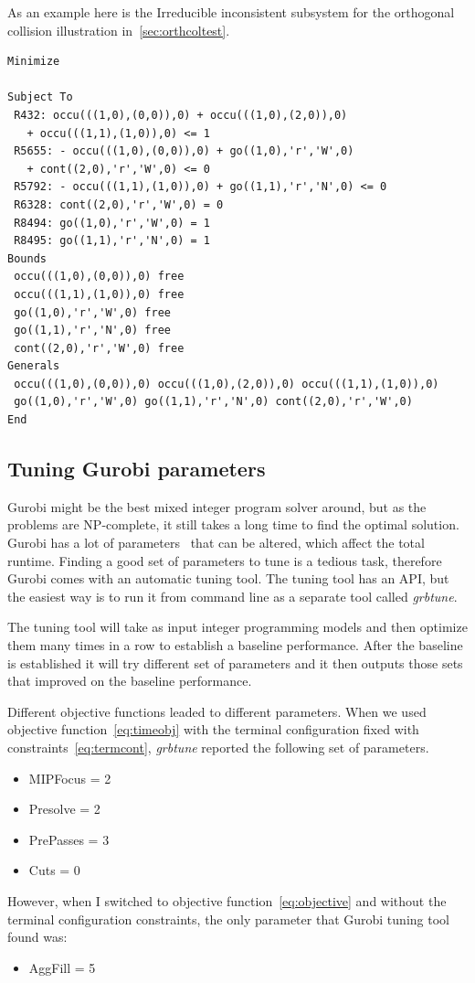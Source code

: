 As an example here is the Irreducible inconsistent subsystem for the orthogonal
collision illustration in~\autoref{sec:orthcoltest}.
\begin{verbatim}
Minimize
 
Subject To
 R432: occu(((1,0),(0,0)),0) + occu(((1,0),(2,0)),0)
   + occu(((1,1),(1,0)),0) <= 1
 R5655: - occu(((1,0),(0,0)),0) + go((1,0),'r','W',0)
   + cont((2,0),'r','W',0) <= 0
 R5792: - occu(((1,1),(1,0)),0) + go((1,1),'r','N',0) <= 0
 R6328: cont((2,0),'r','W',0) = 0
 R8494: go((1,0),'r','W',0) = 1
 R8495: go((1,1),'r','N',0) = 1
Bounds
 occu(((1,0),(0,0)),0) free
 occu(((1,1),(1,0)),0) free
 go((1,0),'r','W',0) free
 go((1,1),'r','N',0) free
 cont((2,0),'r','W',0) free
Generals
 occu(((1,0),(0,0)),0) occu(((1,0),(2,0)),0) occu(((1,1),(1,0)),0)
 go((1,0),'r','W',0) go((1,1),'r','N',0) cont((2,0),'r','W',0)
End
\end{verbatim}
\subsection{Tuning Gurobi parameters}
Gurobi might be the best mixed integer program solver around, but as the
problems are NP-complete, it still takes a long time to find the optimal
solution. Gurobi has a lot of parameters~\cite{gurobiparams} that can be
altered, which affect the total runtime. Finding a good set of parameters to
tune is a tedious task, therefore Gurobi comes with an automatic tuning tool.
The tuning tool has an API, but the easiest way is to run it from command line
as a separate tool called \textit{grbtune}.

The tuning tool will take as input integer programming models and then optimize
them many times in a row to establish a baseline performance. After the
baseline is established it will try different set of parameters and it then
outputs those sets that improved on the baseline performance.

Different objective functions leaded to different parameters. When we used
objective function~\eqref{eq:timeobj} with the terminal configuration fixed
with constraints~\eqref{eq:termcont}, \textit{grbtune} reported the following
set of parameters.
\begin{itemize}
    \item MIPFocus = 2
    \item Presolve = 2
    \item PrePasses = 3
    \item Cuts = 0
\end{itemize}

However, when I switched to objective function~\eqref{eq:objective} and
without the terminal configuration constraints, the only parameter that Gurobi
tuning tool found was:
\begin{itemize}
    \item AggFill = 5
\end{itemize}
